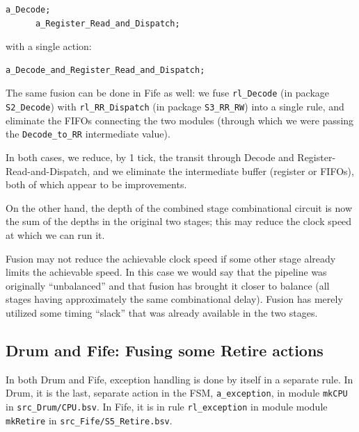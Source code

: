 {\small
\begin{Verbatim}[frame=single]
      a_Decode;
      a_Register_Read_and_Dispatch;
\end{Verbatim}
}

with a single action:

{\small
\begin{Verbatim}[frame=single]
      a_Decode_and_Register_Read_and_Dispatch;
\end{Verbatim}
}

The same fusion can be done in Fife as well: we fuse \verb|rl_Decode|
(in package \verb|S2_Decode|) with \verb|rl_RR_Dispatch| (in package
\verb|S3_RR_RW|) into a single rule, and eliminate the FIFOs
connecting the two modules (through which we were passing the
\verb|Decode_to_RR| intermediate value).

In both cases, we reduce, by 1 tick, the transit through Decode and
Register-Read-and-Dispatch, and we eliminate the intermediate buffer
(register or FIFOs), both of which appear to be improvements.

On the other hand, the depth of the combined stage combinational
circuit is now the sum of the depths in the original two stages; this
may reduce the clock speed at which we can run it.


Fusion may not reduce the achievable clock speed if some other stage
already limits the achievable speed.  In this case we would say that
the pipeline was originally ``unbalanced'' and that fusion has brought
it closer to balance (all stages having approximately the same
combinational delay).  Fusion has merely utilized some timing
``slack'' that was already available in the two stages.


\subsection{Drum and Fife: Fusing some Retire actions}

In both Drum and Fife, exception handling is done by itself in a
separate rule.  In Drum, it is the last, separate action in the FSM,
\verb|a_exception|, in module \verb|mkCPU| in \verb|src_Drum/CPU.bsv|.
In Fife, it is in rule \verb|rl_exception| in module module
\verb|mkRetire| in \verb|src_Fife/S5_Retire.bsv|.


